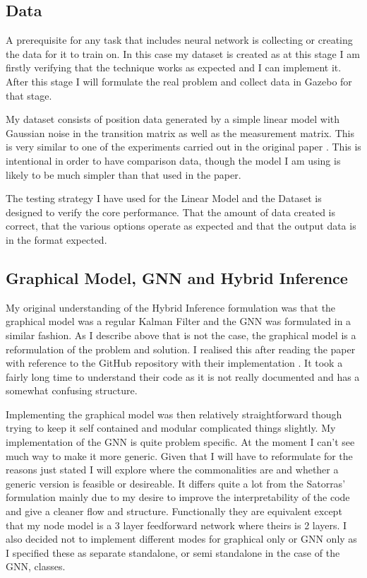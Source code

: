 \documentclass[]{../resources/final_report}
\begin{document}
\subsection{Data}
A prerequisite for any task that includes neural network is collecting or creating the data for it to train on.
In this case my dataset is created as at this stage I am firstly verifying that the technique works as expected and I can implement it.
After this stage I will formulate the real problem and collect data in Gazebo for that stage.

My dataset consists of position data generated by a simple linear model with Gaussian noise in the transition matrix as well as the measurement matrix.
This is very similar to one of the experiments carried out in the original paper \cite{Satorras2019CombiningGA}. This is intentional in order to have comparison data, though the model I am using is likely to be much simpler than that used in the paper.

The testing strategy I have used for the Linear Model and the Dataset is designed to verify the core performance.
That the amount of data created is correct, that the various options operate as expected and that the output data is in the format expected.

\subsection{Graphical Model, GNN and Hybrid Inference}

My original understanding of the Hybrid Inference formulation was that the graphical model was a regular Kalman Filter and the GNN was formulated in a similar fashion.
As I describe above that is not the case, the graphical model is a reformulation of the problem and solution. 
I realised this after reading the paper with reference to the GitHub repository with their implementation \cite{vgsatorrasgithub}. It took a fairly long time to understand their code as it is not really documented and has a somewhat confusing structure.

Implementing the graphical model was then relatively straightforward though trying to keep it self contained and modular complicated things slightly. 
My implementation of the GNN is quite problem specific. At the moment I can't see much way to make it more generic. Given that I will have to reformulate for the reasons just stated I will explore where the commonalities are and whether a generic version is feasible or desireable.
It differs quite a lot from the Satorras' formulation mainly due to my desire to improve the interpretability of the code and give a cleaner flow and structure. Functionally they are equivalent except that my node model is a 3 layer feedforward network where theirs is 2 layers.
I also decided not to implement different modes for graphical only or GNN only as I specified these as separate standalone, or semi standalone in the case of the GNN, classes.
\end{document}
